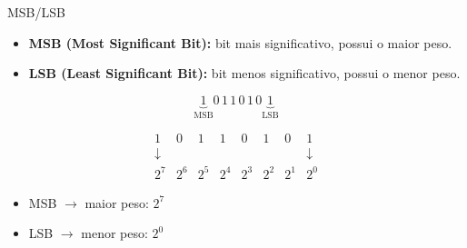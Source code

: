 

\begin{frame}{MSB/LSB}
    \begin{itemize}
        \item \textbf{MSB (Most Significant Bit):} bit mais significativo,
        possui o maior peso.

        \item \textbf{LSB (Least Significant Bit):} bit menos significativo,
        possui o menor peso.
    \end{itemize}

    \vspace{0.7cm}

    \[
        \underbrace{1}_{\text{MSB}}
        0\,1\,1\,0\,1\,0
        \underbrace{1}_{\text{LSB}}
    \]

    \vspace{0.5cm}

    \[
        \begin{array}{cccccccc}
        1 & 0 & 1 & 1 & 0 & 1 & 0 & 1 \\
        \downarrow & & & & & & & \downarrow \\
        2^7 & 2^6 & 2^5 & 2^4 & 2^3 & 2^2 & 2^1 & 2^0
        \end{array}
    \]

    \vspace{0.3cm}

    \begin{itemize}
        \item MSB $\rightarrow$ maior peso: $2^7$
        \item LSB $\rightarrow$ menor peso: $2^0$
    \end{itemize}
\end{frame}